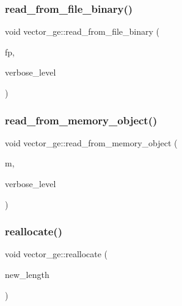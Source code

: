 \subsubsection{\texorpdfstring{read\+\_\+from\+\_\+file\+\_\+binary()}{read\_from\_file\_binary()}}
{\footnotesize\ttfamily void vector\+\_\+ge\+::read\+\_\+from\+\_\+file\+\_\+binary (\begin{DoxyParamCaption}\item[{ifstream \&}]{fp,  }\item[{\mbox{\hyperlink{galois_8h_a09fddde158a3a20bd2dcadb609de11dc}{I\+NT}}}]{verbose\+\_\+level }\end{DoxyParamCaption})}

\mbox{\label{classvector__ge_aa03fd3f7e7bb6737d4c18af0c43d34ea}} 
\subsubsection{\texorpdfstring{read\+\_\+from\+\_\+memory\+\_\+object()}{read\_from\_memory\_object()}}
{\footnotesize\ttfamily void vector\+\_\+ge\+::read\+\_\+from\+\_\+memory\+\_\+object (\begin{DoxyParamCaption}\item[{\mbox{\hyperlink{classmemory__object}{memory\+\_\+object}} $\ast$}]{m,  }\item[{\mbox{\hyperlink{galois_8h_a09fddde158a3a20bd2dcadb609de11dc}{I\+NT}}}]{verbose\+\_\+level }\end{DoxyParamCaption})}

\mbox{\label{classvector__ge_ab19fc29d1eaeca0daa2dd397819a701f}} 
\subsubsection{\texorpdfstring{reallocate()}{reallocate()}}
{\footnotesize\ttfamily void vector\+\_\+ge\+::reallocate (\begin{DoxyParamCaption}\item[{\mbox{\hyperlink{galois_8h_a09fddde158a3a20bd2dcadb609de11dc}{I\+NT}}}]{new\+\_\+length }\end{DoxyParamCaption})}

